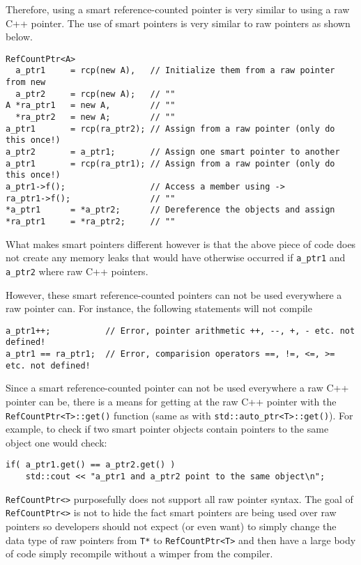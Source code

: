 Therefore, using a smart reference-counted pointer is very similar to
using a raw C++ pointer.  The use of smart pointers is very similar
to raw pointers as shown below.

{\scriptsize\begin{verbatim}
RefCountPtr<A>
  a_ptr1     = rcp(new A),   // Initialize them from a raw pointer from new
  a_ptr2     = rcp(new A);   // ""
A *ra_ptr1   = new A,        // ""
  *ra_ptr2   = new A;        // ""
a_ptr1       = rcp(ra_ptr2); // Assign from a raw pointer (only do this once!)
a_ptr2       = a_ptr1;       // Assign one smart pointer to another
a_ptr1       = rcp(ra_ptr1); // Assign from a raw pointer (only do this once!)
a_ptr1->f();                 // Access a member using ->
ra_ptr1->f();                // ""
*a_ptr1      = *a_ptr2;      // Dereference the objects and assign
*ra_ptr1     = *ra_ptr2;     // "" 
\end{verbatim}}

What makes smart pointers different however is that the above piece of code
does not create any memory leaks that would have otherwise occurred
if {}\texttt{a\_ptr1} and {}\texttt{a\_ptr2} where raw C++ pointers.

However, these smart reference-counted pointers can not be used
everywhere a raw pointer can.  For instance, the following
statements will not compile

{\scriptsize\begin{verbatim}
a_ptr1++;           // Error, pointer arithmetic ++, --, +, - etc. not defined!
a_ptr1 == ra_ptr1;  // Error, comparision operators ==, !=, <=, >= etc. not defined!
\end{verbatim}}

Since a smart reference-counted pointer can not be used everywhere a
raw C++ pointer can be, there is a means for getting at the raw C++
pointer with the {}\texttt{RefCountPtr<T>::get()} function (same as with
{}\texttt{std::auto\_ptr<T>::get()}).  For example, to check if two
smart pointer objects contain pointers to the same object one would
check:

{\scriptsize\begin{verbatim}
if( a_ptr1.get() == a_ptr2.get() )
    std::cout << "a_ptr1 and a_ptr2 point to the same object\n";
\end{verbatim}}

{}\texttt{RefCountPtr<>} purposefully does not support all raw pointer
syntax.  The goal of {}\texttt{RefCountPtr<>} is not to hide the fact
smart pointers are being used over raw pointers so developers should
not expect (or even want) to simply change the data type of raw
pointers from {}\texttt{T*} to {}\texttt{Ref\-Count\-Ptr<T>} and then
have a large body of code simply recompile without a wimper from the
compiler.

